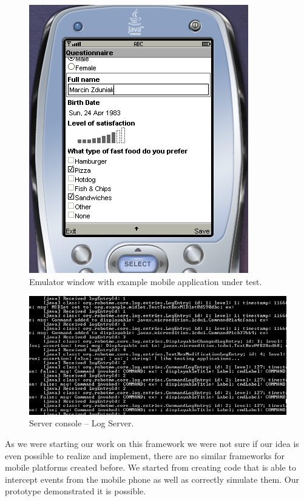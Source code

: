 \begin{figure}[t]%
\begin{center}
\includegraphics[width=.6\linewidth]{figures/screen-1b-emulator}
\end{center}
\caption{Emulator window with example mobile application under test.}%
\label{fig:screen-1b-emulator}
\end{figure}

\begin{figure}[t]%
\begin{center}
\includegraphics[width=\linewidth]{figures/screen-2-console}
\end{center}
\caption{Server console -- Log Server.}%
\label{fig:screen-2-console}
\end{figure}

As we were starting our work on this framework we were not sure if our idea is
even possible to realize and implement, there are no similar frameworks
for mobile platforms created before. We started from creating code that is
able to intercept events from the mobile phone as well as correctly
simulate them. Our prototype demonstrated it is possible.

